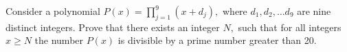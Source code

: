 Consider a polynomial 
$P(x) =  \prod^9_{j=1}(x+d_j),$
 where 
$d_1, d_2, \ldots d_9$
 are nine distinct integers. Prove that there exists an integer 
$N,$
 such that for all integers 
$x \geq N$
 the number 
$P(x)$
 is divisible by a prime number greater than 20.
